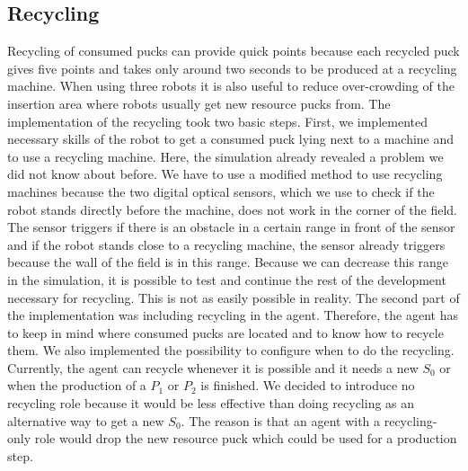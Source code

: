 \subsection{Recycling}
Recycling of consumed pucks can provide quick points because each recycled puck gives five points and takes only around two seconds to be produced at a recycling machine. When using three robots it is also useful to reduce over-crowding of the insertion area where robots usually get new resource pucks from. The implementation of the recycling took two basic steps. First, we implemented necessary skills of the robot to get a consumed puck lying next to a machine and to use a recycling machine. Here, the simulation already revealed a problem we did not know about before. We have to use a modified method to use recycling machines because the two digital optical sensors, which we use to check if the robot stands directly before the machine, does not work in the corner of the field. The sensor triggers if there is an obstacle in a certain range in front of the sensor and if the robot stands close to a recycling machine, the sensor already triggers because the wall of the field is in this range. Because we can decrease this range in the simulation, it is possible to test and continue the rest of the development necessary for recycling. This is not as easily possible in reality. The second part of the implementation was including recycling in the agent. Therefore, the agent has to keep in mind where consumed pucks are located and to know how to recycle them. We also implemented the possibility to configure when to do the recycling. Currently, the agent can recycle whenever it is possible and it needs a new $S_0$ or when the production of a $P_1$ or $P_2$ is finished. We decided to introduce no recycling role because it would be less effective than doing recycling as an alternative way to get a new $S_0$. The reason is that an agent with a recycling-only role would drop the new resource puck which could be used for a production step.

